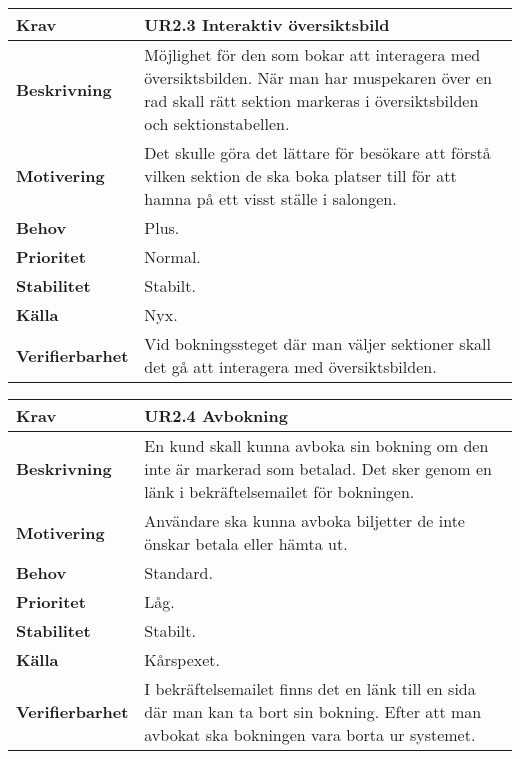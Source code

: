 \documentclass[a4paper, twoside, 11pt, titlepage]{article}
\begin{document}
		\begin{tabular} { p{2.6cm} p{12.5cm} }
			\hline
			\sffamily\textbf{Krav} & \sffamily\textbf{UR2.3 Interaktiv översiktsbild  } \\
			\hline
			\sffamily\textbf{Beskrivning} & Möjlighet för den som bokar att interagera med översiktsbilden. När man har muspekaren över en rad skall rätt sektion markeras i översiktsbilden och sektionstabellen.  \\
			\hline
			\sffamily\textbf{Motivering} & Det skulle göra det lättare för besökare att förstå vilken sektion de ska boka platser till för att hamna på ett visst ställe i salongen.  \\
			\hline
			\sffamily\textbf{Behov} & Plus.  \\
			\hline
			\sffamily\textbf{Prioritet} & Normal.  \\
			\hline
			\sffamily\textbf{Stabilitet} & Stabilt.  \\
			\hline
			\sffamily\textbf{Källa} & Nyx.  \\
			\hline
			\sffamily\textbf{Verifierbarhet} & Vid bokningssteget där man väljer sektioner skall det gå att interagera med översiktsbilden.  \\
			\hline
		\end{tabular}
		\vspace{6mm}

		\begin{tabular} { p{2.6cm} p{12.5cm} }
			\hline
			\sffamily\textbf{Krav} & \sffamily\textbf{UR2.4 Avbokning  } \\
			\hline
			\sffamily\textbf{Beskrivning} & En kund skall kunna avboka sin bokning om den inte är markerad som betalad. Det sker genom en länk i bekräftelsemailet för bokningen.  \\
			\hline
			\sffamily\textbf{Motivering} & Användare ska kunna avboka biljetter de inte önskar betala eller hämta ut.  \\
			\hline
			\sffamily\textbf{Behov} & Standard.  \\
			\hline
			\sffamily\textbf{Prioritet} & Låg.  \\
			\hline
			\sffamily\textbf{Stabilitet} & Stabilt.  \\
			\hline
			\sffamily\textbf{Källa} & Kårspexet.  \\
			\hline
			\sffamily\textbf{Verifierbarhet} & I bekräftelsemailet finns det en länk till en sida där man kan ta bort sin bokning. Efter att man avbokat ska bokningen vara borta ur systemet.  \\
			\hline
		\end{tabular}
		\vspace{6mm}
\end{document}
